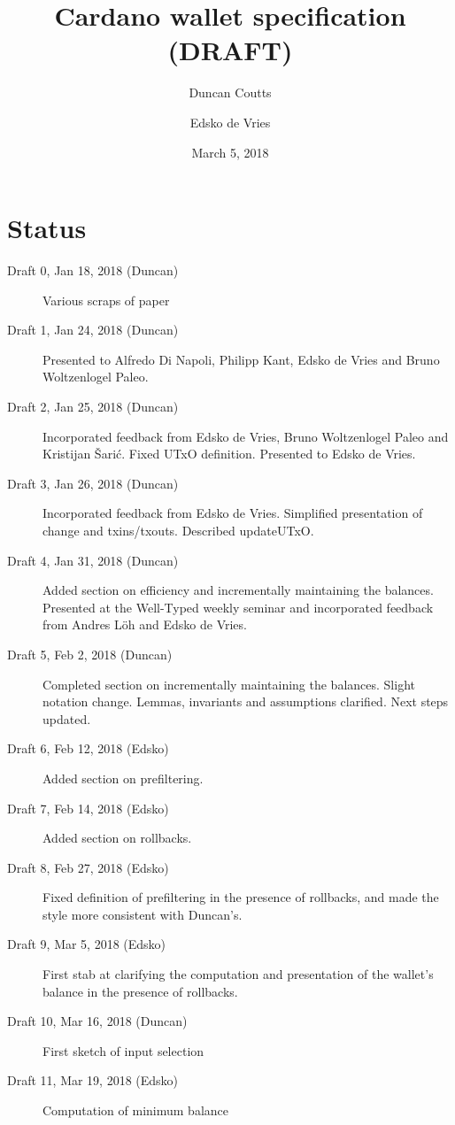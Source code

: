 \documentclass{article}
\begin{document}
\title{Cardano wallet specification (DRAFT)}
\author{Duncan Coutts \and Edsko de Vries}
\date{March 5, 2018}

\maketitle

\section*{Status}

\begin{description}
\item[Draft 0, Jan 18, 2018 (Duncan)] Various scraps of paper
\item[Draft 1, Jan 24, 2018 (Duncan)] Presented to Alfredo Di Napoli, Philipp Kant,
     Edsko de Vries and Bruno Woltzenlogel Paleo.
\item[Draft 2, Jan 25, 2018 (Duncan)] Incorporated feedback from Edsko de Vries,
     Bruno Woltzenlogel Paleo and Kristijan \v{S}ari\'{c}. Fixed UTxO
     definition. Presented to Edsko de Vries.
\item[Draft 3, Jan 26, 2018 (Duncan)] Incorporated feedback from Edsko de Vries.
     Simplified presentation of change and txins/txouts. Described updateUTxO.
\item[Draft 4, Jan 31, 2018 (Duncan)] Added section on efficiency and incrementally
     maintaining the balances. Presented at the Well-Typed weekly seminar and
     incorporated feedback from Andres L\"oh and Edsko de Vries.
\item[Draft 5, Feb 2, 2018 (Duncan)] Completed section on incrementally maintaining the
     balances. Slight notation change. Lemmas, invariants and assumptions
     clarified. Next steps updated.
\item[Draft 6, Feb 12, 2018 (Edsko)] Added section on prefiltering.
\item[Draft 7, Feb 14, 2018 (Edsko)] Added section on rollbacks.
\item[Draft 8, Feb 27, 2018 (Edsko)] Fixed definition of prefiltering in the presence
     of rollbacks, and made the style more consistent with Duncan's.
\item[Draft 9, Mar 5, 2018 (Edsko)] First stab at clarifying the computation and
     presentation of the wallet's balance in the presence of rollbacks.
\item[Draft 10, Mar 16, 2018 (Duncan)] First sketch of input selection
\item[Draft 11, Mar 19, 2018 (Edsko)] Computation of minimum balance
\end{description}
\end{document}
